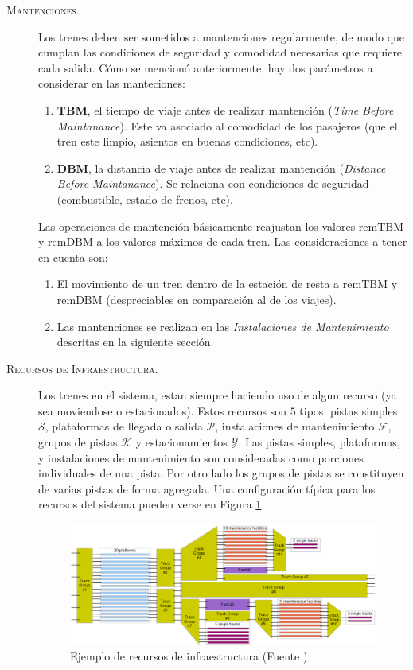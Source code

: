 \documentclass[letter, 10pt]{article}
\begin{document}
\begin{description}
	\item[\textsc{Mantenciones.}]
	Los trenes deben ser sometidos a mantenciones regularmente, de modo que cumplan las condiciones de seguridad y comodidad necesarias que requiere cada salida. Cómo se mencionó anteriormente, hay dos parámetros a considerar en las manteciones:
	\begin{enumerate}
		\item \textbf{TBM}, el tiempo de viaje antes de realizar mantención (\textit{Time Before Maintanance}). Este va asociado al comodidad de los pasajeros (que el tren este limpio, asientos en buenas condiciones, etc).
		\item \textbf{DBM}, la distancia de viaje antes de realizar mantención (\textit{Distance Before Maintanance}). Se 
		relaciona con condiciones de seguridad (combustible, estado de frenos, etc).  
	\end{enumerate}
	Las operaciones de mantención básicamente reajustan los valores $\text{remTBM}$ y $\text{remDBM}$ a los valores máximos de cada tren. Las consideraciones a tener en cuenta son:
	\begin{enumerate}
		\item El movimiento de un tren dentro de la estación de resta a $\text{remTBM}$ y $\text{remDBM}$ (despreciables en comparación al de los viajes).
		\item Las mantenciones se realizan en las \textit{Instalaciones de Mantenimiento} descritas en la siguiente sección. 
	\end{enumerate}

	\item[\textsc{Recursos de Infraestructura.}]
	Los trenes en el sistema, estan siempre haciendo uso de algun recurso (ya sea moviendose o estacionados). Estos recursos
	son $5$ tipos: pistas simples $\mathcal{S}$, plataformas de llegada o salida $\mathcal{P}$, instalaciones de mantenimiento $\mathcal{F}$, grupos de pistas $\mathcal{K}$ y estacionamientos $\mathcal{Y}$. Las pistas simples, plataformas, y instalaciones de mantenimiento son consideradas como porciones individuales de una pista. Por otro lado 
	los grupos de pistas se constituyen de varias pistas de forma agregada. Una configuración típica para los recursos del
	sistema pueden verse en Figura \ref{fig:resources}.
 	\begin{figure}[htpb!]
	\centering
	\includegraphics[width=12cm]{resources}
	\caption{Ejemplo de recursos de infraestructura (Fuente \cite{Problem})}
	\label{fig:resources}
	\end{figure}


\end{description}
\end{document}
